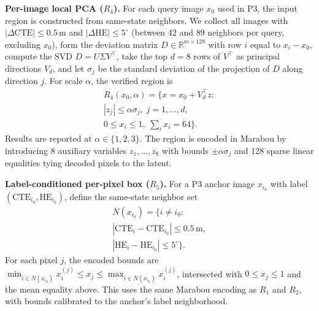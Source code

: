 \documentclass[twocolumn,smallextended,runningheads]{svjour3}
\begin{document}
\textbf{Per-image local PCA ($R_4$).} For each query image $x_0$ used in P3, the input region is constructed from same-state neighbors. We collect all images with $|\Delta\text{CTE}| \le 0.5$\,m and $|\Delta\text{HE}| \le 5^\circ$ (between 42 and 89 neighbors per query, excluding $x_0$), form the deviation matrix $D \in \mathbb{R}^{m \times 128}$ with row $i$ equal to $x_i - x_0$, compute the SVD $D = U \Sigma V^\top$, take the top $d=8$ rows of $V^\top$ as principal directions $V_d$, and let $\sigma_j$ be the standard deviation of the projection of $D$ along direction $j$. For scale $\alpha$, the verified region is
\begin{multline*}
R_4(x_0,\alpha)=\{x=x_0+V_d^\top z: \\
|z_j|\le \alpha\sigma_j,\; j=1,\ldots,d, \\
0\le x_i\le 1,\; \textstyle\sum_i x_i=64\}.
\end{multline*}
Results are reported at $\alpha \in \{1, 2, 3\}$. The region is encoded in Marabou by introducing 8 auxiliary variables $z_1, \dots, z_8$ with bounds $\pm \alpha \sigma_j$ and 128 sparse linear equalities tying decoded pixels to the latent.

\textbf{Label-conditioned per-pixel box ($R_5$).} For a P3 anchor image $x_{i_0}$ with label $(\mathrm{CTE}_{i_0},\mathrm{HE}_{i_0})$, define the same-state neighbor set
\begin{multline*}
N(x_{i_0})=\{i\ne i_0: \\
|\mathrm{CTE}_i-\mathrm{CTE}_{i_0}|\le 0.5\,\mathrm{m}, \\
|\mathrm{HE}_i-\mathrm{HE}_{i_0}|\le 5^\circ\}.
\end{multline*}
For each pixel $j$, the encoded bounds are $\min_{i\in N(x_{i_0})} x_i^{(j)} \le x_j \le \max_{i\in N(x_{i_0})} x_i^{(j)}$, intersected with $0\le x_j\le 1$ and the mean equality above. This uses the same Marabou encoding as $R_1$ and $R_2$, with bounds calibrated to the anchor's label neighborhood.
\end{document}
